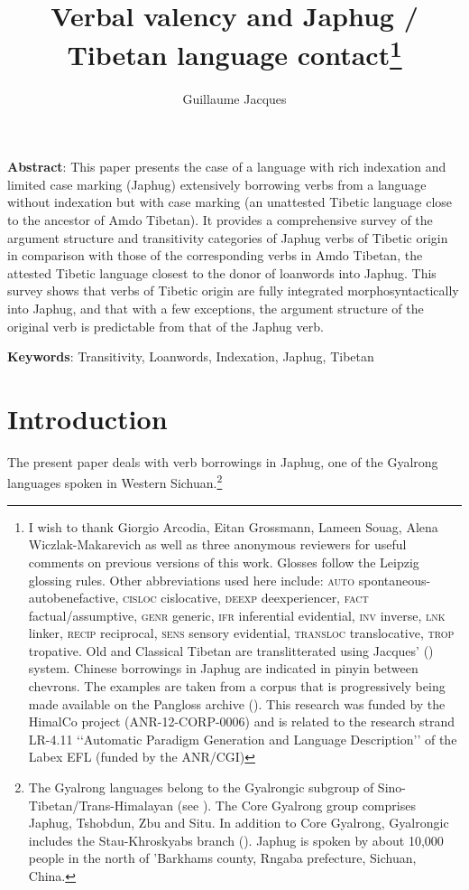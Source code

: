 \documentclass[oneside,a4paper,11pt]{article}
\begin{document}
 
\title{Verbal valency and Japhug / Tibetan language contact\footnote{I wish to thank Giorgio Arcodia, Eitan Grossmann, Lameen Souag, Alena Wiczlak-Makarevich as well as three anonymous reviewers for useful comments on previous versions of this work. Glosses follow the Leipzig glossing rules. Other abbreviations used here include: \textsc{auto} spontaneous-autobenefactive, \textsc{cisloc} cislocative,  \textsc{deexp} deexperiencer, \textsc{fact} factual/assumptive, \textsc{genr} generic, \textsc{ifr} inferential evidential,  \textsc{inv} inverse, \textsc{lnk} linker, \textsc{recip} reciprocal, \textsc{sens} sensory  evidential, \textsc{transloc} translocative, \textsc{trop} tropative.  Old and Classical Tibetan are translitterated using Jacques' (\citeyear{jacques12transcription}) system.  Chinese borrowings in Japhug are indicated in pinyin between chevrons. The examples are taken from a corpus that is progressively being made available on the Pangloss archive (\citealt{michailovsky14pangloss}). This research was funded by the HimalCo project (ANR-12-CORP-0006) and is related to the research strand LR-4.11 ‘‘Automatic Paradigm Generation and Language Description’’ of the Labex EFL (funded by the ANR/CGI) }} 
\author{Guillaume Jacques}
\maketitle 

\textbf{Abstract}: This paper presents the case of a language with rich indexation and limited case marking (Japhug) extensively borrowing verbs from a language without indexation but with case marking (an unattested Tibetic language close to the ancestor of Amdo Tibetan). It provides a comprehensive survey of the argument structure and transitivity categories of Japhug verbs of Tibetic origin in comparison with those of the corresponding verbs in Amdo Tibetan, the attested Tibetic language closest to the donor of loanwords into Japhug. This survey shows that verbs of Tibetic origin are fully integrated morphosyntactically into Japhug, and that with a few exceptions, the argument structure of the original verb is predictable from that of the Japhug verb.

\textbf{Keywords}: Transitivity, Loanwords, Indexation, Japhug, Tibetan


\section{Introduction}
The present paper deals with verb borrowings in Japhug, one of the Gyalrong languages spoken in Western Sichuan.\footnote{The Gyalrong languages belong to the Gyalrongic subgroup of Sino-Tibetan/Trans-Himalayan (see \citealt{jackson00puxi}). The Core Gyalrong group comprises Japhug, Tshobdun, Zbu and Situ. In addition to Core Gyalrong, Gyalrongic includes the Stau-Khroskyabs branch (\citealt{lai15person}). Japhug is spoken by about 10,000 people in the north of 'Barkhams county, Rngaba prefecture, Sichuan, China. } 
\end{document}
